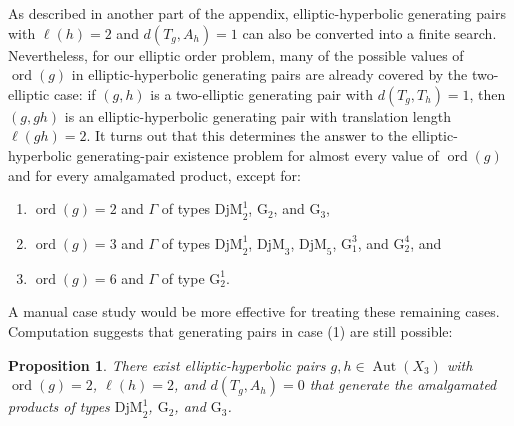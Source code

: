 \documentclass[12pt,leqno]{amsart}
\newcommand{\2}{L^2_{\rm per}(0, T)}
\newtheorem{prop}{Proposition}[section]
\newcommand{\aut}{{\operatorname{Aut}}}
\newcommand{\ord}{{\operatorname{ord}}}
\numberwithin{equation}{section}
\numberwithin{figure}{section}
\begin{document}
As described in another part of the appendix, elliptic-hyperbolic generating pairs with $\ell(h) = 2$ and $d(T_g,A_h) = 1$ can also be converted into a finite search. Nevertheless, for our elliptic order problem, many of the possible values of $\ord(g)$ in elliptic-hyperbolic generating pairs are already covered by the two-elliptic case: if $(g,h)$ is a two-elliptic generating pair with $d(T_g,T_h) = 1$, then $(g,gh)$ is an elliptic-hyperbolic generating pair with translation length $\ell(gh) = 2$. It turns out that this determines the answer to the elliptic-hyperbolic generating-pair existence problem for almost every value of $\ord(g)$ and for every amalgamated product, except for:
\begin{enumerate}
    \item $\ord(g) = 2$ and $\Gamma$ of types $\mathrm{DjM}_2^1$, $\mathrm{G}_2$, and $\mathrm{G}_3$,
    \item $\ord(g) = 3$ and $\Gamma$ of types $\mathrm{DjM}_2^1$, $\mathrm{DjM}_3$, $\mathrm{DjM}_5$, $\mathrm{G}_1^3$, and $\mathrm{G}_2^4$, and
    \item $\ord(g) = 6$ and $\Gamma$ of type $\mathrm{G}_2^1$.
\end{enumerate}
A manual case study would be more effective for treating these remaining cases. Computation suggests that generating pairs in case (1) are still possible:
\begin{prop}\label{prop:ell_hyp}
    There exist elliptic-hyperbolic pairs $g,h\in\aut(X_3)$ with $\ord(g) = 2$, $\ell(h) = 2$, and $d(T_g, A_h) = 0$ that generate the amalgamated products of types $\mathrm{DjM}_2^1$, $\mathrm{G}_2$, and $\mathrm{G}_3$.
\end{prop}
\end{document}

